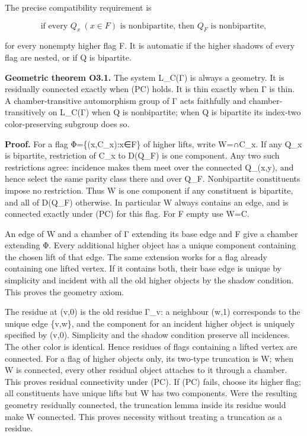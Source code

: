 \documentclass[
  10pt,
  letterpaper,
]{article}
\newcounter{none} %
\begin{document}
The precise compatibility requirement is

\[
\text{if every }Q_x\ (x\in F)\text{ is nonbipartite, then }Q_F
\text{ is nonbipartite},
\tag{PC}
\]

for every nonempty higher flag F. It is automatic if the higher shadows
of every flag are nested, or if Q is bipartite.

\textbf{Geometric theorem O3.1.} The system L\_C(Γ) is always a
geometry. It is residually connected exactly when (PC) holds. It is thin
exactly when Γ is thin. A chamber-transitive automorphism group of Γ
acts faithfully and chamber-transitively on L\_C(Γ) when Q is
nonbipartite; when Q is bipartite its index-two color-preserving
subgroup does so.

\textbf{Proof.} For a flag Φ=\{(x,C\_x):x∈F\} of higher lifts, write
W=∩C\_x. If any Q\_x is bipartite, restriction of C\_x to D(Q\_F) is one
component. Any two such restrictions agree: incidence makes them meet
over the connected Q\_(x,y), and hence select the same parity class
there and over Q\_F. Nonbipartite constituents impose no restriction.
Thus W is one component if any constituent is bipartite, and all of
D(Q\_F) otherwise. In particular W always contains an edge, and is
connected exactly under (PC) for this flag. For F empty use W=C.

An edge of W and a chamber of Γ extending its base edge and F give a
chamber extending Φ. Every additional higher object has a unique
component containing the chosen lift of that edge. The same extension
works for a flag already containing one lifted vertex. If it contains
both, their base edge is unique by simplicity and incident with all the
old higher objects by the shadow condition. This proves the geometry
axiom.

The residue at (v,0) is the old residue Γ\_v: a neighbour (w,1)
corresponds to the unique edge \{v,w\}, and the component for an
incident higher object is uniquely specified by (v,0). Simplicity and
the shadow condition preserve all incidences. The other color is
identical. Hence residues of flags containing a lifted vertex are
connected. For a flag of higher objects only, its two-type truncation is
W; when W is connected, every other residual object attaches to it
through a chamber. This proves residual connectivity under (PC). If (PC)
fails, choose its higher flag; all constituents have unique lifts but W
has two components. Were the resulting geometry residually connected,
the truncation lemma inside its residue would make W connected. This
proves necessity without treating a truncation as a residue.
\end{document}
